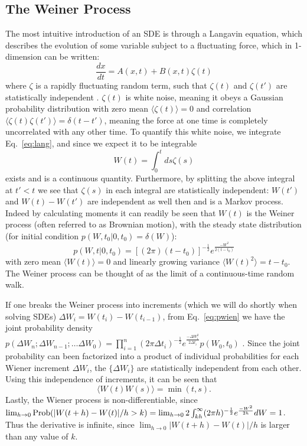 \documentclass[notitlepage,pra,10pt,aps]{revtex4-2}
\newcommand {\be}{\begin{equation}}
\newcommand {\ee}{\end{equation}}
\newcommand{\expect}[1]{\langle#1\rangle}
\begin{document}
\subsection{The Weiner Process}
\label{subsec:Weiner}

The most intuitive introduction of an SDE is through a Langavin equation, which describes the evolution of some variable subject to a fluctuating force, which in 1-dimension can be written:
\be
\frac{d x}{dt}=A(x, t) +B(x, t)\zeta(t) \label{eq:lang}
\ee
where $\zeta$ is a rapidly fluctuating random term, such that $\zeta(t)$ and $\zeta(t')$ are statistically independent \cite{Gardiner2004}.   $\zeta(t)$ is white noise, meaning it obeys a Gaussian probability distribution with zero mean $\expect{\zeta(t)}=0$ and correlation $\expect{\zeta(t)\zeta(t')}=\delta(t-t')$, meaning the force at one time is completely uncorrelated with any other time.  To quantify this white noise, we integrate Eq.~\eqref{eq:lang}, and since we expect it to be integrable
\be
W(t)=\int_0^t ds \zeta(s)
\ee
exists and is a continuous quantity.  Furthermore, by splitting the above integral at $t'<t$ we see that $\zeta(s)$ in each integral are statistically independent: $W(t')$ and $W(t)-W(t')$ are independent as well then and is a Markov process.  Indeed by calculating moments it can readily be seen that $W(t)$ is the Weiner process (often referred to as Brownian motion), with the steady state distribution  (for initial condition $p(W, t_0| 0, t_0)= \delta(W)$):
\be
p(W, t| 0, t_0)=[(2\pi)(t-t_0)]^{-\frac{1}{2}}e^{\frac{-W^2}{2(t-t_0)}} \label{eq:pwien}
\ee
with zero mean $\expect{{W}(t)}=0$ and  linearly growing variance \cite{Gardiner2004} $\expect{W(t)^2}=t-t_0$. The Weiner process can be thought of as the limit of a continuous-time random walk.


 If one breaks the Weiner process into increments (which we will do shortly when solving SDEs) ${\Delta W_i}=W(t_i)-{W}(t_{i-1})$, from Eq.~\eqref{eq:pwien} we have the joint probability density $p({\Delta W_n}; {\Delta W_{n-1}};\dots{\Delta W_0})=\prod_{i=1}^n(2\pi\Delta t_i)^{-\frac{1}{2}}e^{\frac{-{\Delta W}_i^2}{2\Delta t_i}}p(W_0, t_0)$ \cite{Gardiner2004}.  Since the joint probability can been factorized into a product of individual probabilities for each Wiener increment  ${\Delta W_i}$, the $\{ {\Delta W_i}\}$ are statistically independent from each other.  Using this independence of increments, it can be seen that
\be
 \expect{{W}(t){W}(s)}=\min(t, s). \label{eq:Wcov}
\ee
Lastly, the Wiener process is non-differentiable, since $\lim_{h\to 0} {\rm Prob}(|W(t+h)-W(t)|/h>k)=\lim_{h\to 0} 2\int_{kh}^\infty (2\pi h)^{-\frac{1}{2}}e^{\frac{-W^2}{2h}}dW = 1$.  Thus the derivative is infinite, since $\lim_{h\to 0} |W(t+h)-W(t)|/h$ is larger than any value of $k$.
\end{document}
